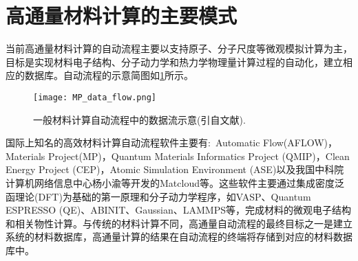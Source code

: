 \section{高通量材料计算的主要模式}
当前高通量材料计算的自动流程主要以支持原子、分子尺度等微观模拟计算为主，目标是实现材料电子结构、分子动力学和热力学物理量计算过程的自动化，建立相应的数据库。自动流程的示意简图如\ref{Fig:MP_data_flow}所示。
\begin{figure}[h!]
\centering
\texttt{[image: MP\_data\_flow.png]}%
\caption{一般材料计算自动流程中的数据流示意(引自文献\cite{CMS49-299_2010}).}%
\label{Fig:MP_data_flow}
\end{figure}

国际上知名的高效材料计算自动流程软件主要有:~\textrm{Automatic Flow(AFLOW)}，\textrm{Materials Project(MP)}，\textrm{Quantum Materials Informatics Project (QMIP)}，\textrm{Clean Energy Project (CEP)}，\textrm{Atomic Simulation Environment (ASE)}以及我国中科院计算机网络信息中心杨小渝等开发的\textrm{Matcloud}等。这些软件主要通过集成密度泛函理论\textrm{(DFT)}为基础的第一原理和分子动力学程序，如\textrm{VASP}、\textrm{Quantum ESPRESSO (QE)}、\textrm{ABINIT}、\textrm{Gaussian}、\textrm{LAMMPS}等，完成材料的微观电子结构和相关物性计算。与传统的材料计算不同，高通量自动流程的最终目标之一是建立系统的材料数据库，高通量计算的结果在自动流程的终端将存储到对应的材料数据库中。

